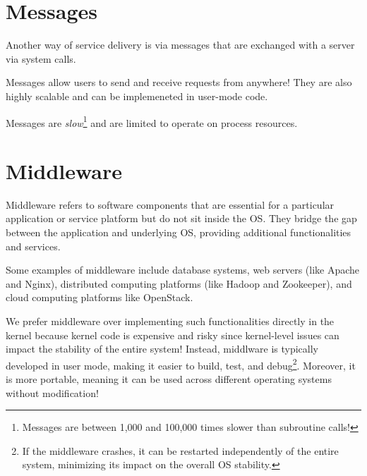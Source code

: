 \documentclass{report}
\begin{document}
\section{Messages}
Another way of service delivery is via messages that are exchanged with a server via system
calls.

\begin{tcbraster}[raster columns=2, raster equal height]
  \begin{tcolorbox}[colback=green!5!white,colframe=black!75!green,title=Advantages]
    Messages allow users to send and receive requests from anywhere! They are also highly scalable and
    can be implemeneted in user-mode code.
  \end{tcolorbox}
  \begin{tcolorbox}[colback=red!5!white,colframe=black!40!red,title=Disadvantages]
    Messages are \textit{slow}\footnote{Messages are between 1,000 and 100,000 times slower than
      subroutine calls!} and are limited to operate on process resources.
  \end{tcolorbox}
\end{tcbraster}


\section{Middleware}
Middleware refers to software components that are essential for a particular application or service
platform but do not sit inside the OS. They bridge the gap between the application and underlying
OS, providing additional functionalities and services.

\begin{tcolorbox}[colback=blue!5!white,colframe=black!75!blue,title=Example: Middleware Madness] 
  Some examples of middleware include database systems, web servers (like Apache and Nginx),
  distributed computing platforms (like Hadoop and Zookeeper), and cloud computing platforms like
  OpenStack.
\end{tcolorbox}

We prefer middleware over implementing such functionalities directly in the kernel because kernel
code is expensive and risky since kernel-level issues can impact the stability of the entire system!
Instead, middlware is typically developed in user mode, making it easier to build, test, and
debug\footnote{If the middleware crashes, it can be restarted independently of the entire system,
  minimizing its impact on the overall OS stability.}. Moreover, it is more portable, meaning it can
be used across different operating systems without modification!
\end{document}
